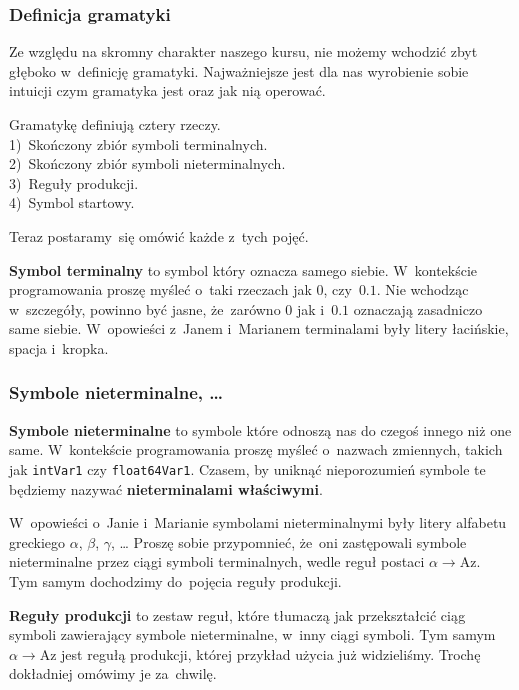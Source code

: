 \documentclass[10pt,t]{beamer}
\begin{document}
\begin{frame}
  \frametitle{Definicja gramatyki}


  Ze względu na skromny charakter naszego kursu, nie możemy wchodzić zbyt
  głęboko w~definicję gramatyki. Najważniejsze jest dla nas wyrobienie
  sobie intuicji czym gramatyka jest oraz jak nią operować.

  Gramatykę definiują cztery rzeczy. \\
  1)~Skończony zbiór symboli terminalnych. \\
  2)~Skończony zbiór symboli nieterminalnych. \\
  3)~Reguły produkcji. \\
  4)~Symbol startowy.

  Teraz postaramy~się omówić każde z~tych pojęć.

  \textbf{Symbol terminalny} to symbol który oznacza samego siebie.
  W~kontekście programowania proszę myśleć o~taki rzeczach jak $0$,
  czy~$0.1$. Nie wchodząc w~szczegóły, powinno być jasne, że~zarówno
  $0$ jak i~$0.1$ oznaczają zasadniczo same siebie. W~opowieści
  z~Janem i~Marianem terminalami były litery łacińskie, spacja i~kropka.

\end{frame}





\begin{frame}
  \frametitle{Symbole nieterminalne, \ldots}


  \textbf{Symbole nieterminalne} to symbole które odnoszą nas do czegoś
  innego niż one same. W~kontekście programowania proszę myśleć o~nazwach
  zmiennych, takich jak \texttt{intVar1} czy \texttt{float64Var1}.
  Czasem, by uniknąć nieporozumień symbole te będziemy nazywać
  \textbf{nieterminalami właściwymi}.

  W~opowieści o~Janie i~Marianie
  symbolami nieterminalnymi były litery
  alfabetu greckiego $\alpha$, $\beta$, $\gamma$, \ldots{ } Proszę sobie przypomnieć, że~oni
  zastępowali symbole nieterminalne przez ciągi symboli terminalnych, wedle
  reguł postaci $\alpha \to \text{Az}$. Tym samym dochodzimy do~pojęcia reguły
  produkcji.

  \textbf{Reguły produkcji} to zestaw reguł, które tłumaczą jak
  przekształcić ciąg symboli zawierający symbole nieterminalne,
  w~inny ciągi symboli. Tym samym $\alpha \to \text{Az}$ jest regułą produkcji,
  której przykład użycia już widzieliśmy. Trochę dokładniej omówimy je
  za~chwilę.

\end{frame}
\end{document}
